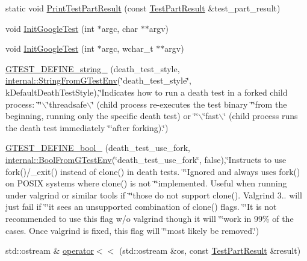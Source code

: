 \begin{DoxyCompactItemize}
\item 
static void \hyperlink{namespacetesting_af2baf2fe4307d85e2124466614b0108a}{\-Print\-Test\-Part\-Result} (const \hyperlink{classtesting_1_1TestPartResult}{\-Test\-Part\-Result} \&test\-\_\-part\-\_\-result)
\item 
void \hyperlink{namespacetesting_a2ba4fda7f4d403cbcdf289327009a2da}{\-Init\-Google\-Test} (int $\ast$argc, char $\ast$$\ast$argv)
\item 
void \hyperlink{namespacetesting_a971fc7a1a79f211cb0b830dd28e9dd41}{\-Init\-Google\-Test} (int $\ast$argc, wchar\-\_\-t $\ast$$\ast$argv)
\item 
\hyperlink{namespacetesting_aa36974bb83a6d932b9163c94630b7135}{\-G\-T\-E\-S\-T\-\_\-\-D\-E\-F\-I\-N\-E\-\_\-string\-\_\-} (death\-\_\-test\-\_\-style, \hyperlink{namespacetesting_1_1internal_a0154be115eea16783f82d3642ff27940}{internal\-::\-String\-From\-G\-Test\-Env}(\char`\"{}death\-\_\-test\-\_\-style\char`\"{}, k\-Default\-Death\-Test\-Style),\char`\"{}\-Indicates how to run a death test in a forked child process\-: \char`\"{}\char`\"{}$\backslash$\char`\"{}threadsafe$\backslash$\char`\"{} (child process re-\/executes the test binary \char`\"{}\char`\"{}from the beginning, running only the specific death test) or \char`\"{}\char`\"{}$\backslash$\char`\"{}fast$\backslash$\char`\"{} (child process runs the death test immediately \char`\"{}\char`\"{}after forking).\char`\"{})
\item 
\hyperlink{namespacetesting_a066dbec0dbe000aa600d344feb9cba62}{\-G\-T\-E\-S\-T\-\_\-\-D\-E\-F\-I\-N\-E\-\_\-bool\-\_\-} (death\-\_\-test\-\_\-use\-\_\-fork, \hyperlink{namespacetesting_1_1internal_af17bf74326e1076c47455ef2618c1a1a}{internal\-::\-Bool\-From\-G\-Test\-Env}(\char`\"{}death\-\_\-test\-\_\-use\-\_\-fork\char`\"{}, false),\char`\"{}\-Instructs to use fork()/\-\_\-exit() instead of clone() in death tests. \char`\"{}\char`\"{}\-Ignored and always uses fork() on \-P\-O\-S\-I\-X systems where clone() is not \char`\"{}\char`\"{}implemented. \-Useful when running under valgrind or similar tools if \char`\"{}\char`\"{}those do not support clone(). \-Valgrind 3.. will just fail if \char`\"{}\char`\"{}it sees an unsupported combination of clone() flags. \char`\"{}\char`\"{}\-It is not recommended to use this flag w/o valgrind though it will \char`\"{}\char`\"{}work in 99\% of the cases. \-Once valgrind is fixed, this flag will \char`\"{}\char`\"{}most likely be removed.\char`\"{})
\item 
std\-::ostream \& \hyperlink{namespacetesting_ae8b6df347210c0ebfe5ec995d03c7aed}{operator$<$$<$} (std\-::ostream \&os, const \hyperlink{classtesting_1_1TestPartResult}{\-Test\-Part\-Result} \&result)

\end{DoxyCompactItemize}
